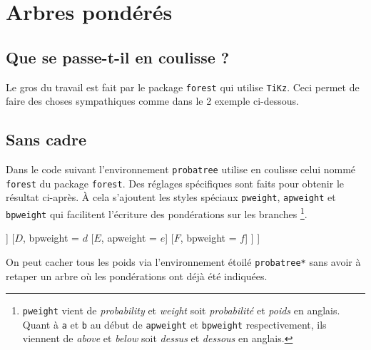 \documentclass[12pt,a4paper]{article}
\begin{document}
\section{Arbres pondérés}

\subsection{Que se passe-t-il en coulisse ?}

Le gros du travail est fait par le package \verb+forest+ qui utilise \verb+TiKz+. Ceci permet de faire des choses sympathiques comme dans le 2\ieme{} exemple ci-dessous.




\subsection{Sans cadre}


Dans le code suivant l'environnement \verb+probatree+ utilise en coulisse celui nommé \verb+forest+ du package \verb+forest+. Des réglages spécifiques sont faits pour obtenir le résultat ci-après.
À cela s'ajoutent les styles spéciaux \verb+pweight+, \verb+apweight+ et \verb+bpweight+ qui facilitent l'écriture des pondérations sur les branches
\footnote{
    \texttt{pweight} vient de \emph{\og probability \fg} et \emph{\og weight\fg} soit \emph{\og probabilité \fg} et \emph{\og poids\fg} en anglais.
    Quant à \texttt{a} et \texttt{b} au début de \texttt{apweight} et \texttt{bpweight} respectivement, ils viennent de \emph{\og above \fg} et \emph{\og below\fg} soit \emph{\og dessus \fg} et \emph{\og dessous\fg} en anglais.
}.

\begin{latexex}
\begin{probatree}
    [
        [$A$, pweight = $a$
            [$B$, pweight = $b$]
            [$C$, pweight = $c$]
        ]
        [$D$, bpweight = $d$
            [$E$, apweight = $e$]
            [$F$, bpweight = $f$]
        ]
    ]
\end{probatree}
\end{latexex}





On peut cacher tous les poids via l'environnement étoilé \verb+probatree*+ sans avoir à retaper un arbre où les pondérations ont déjà été indiquées.
\end{document}
